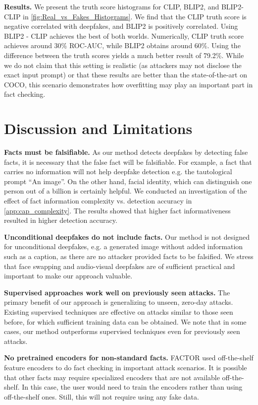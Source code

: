 \documentclass{article} \usepackage{iclr2024_conference,times}
\begin{document}
\textbf{Results.} We present the truth score histograms for CLIP, BLIP2, and BLIP2-CLIP in \cref{fig:Real_vs_Fakes_Histograms}. We find that the CLIP truth score is negative correlated with deepfakes, and BLIP2 is positively correlated. Using BLIP2 - CLIP achieves the best of both worlds. Numerically, CLIP truth score achieves around 30\% ROC-AUC, while BLIP2 obtains around 60\%. Using the difference between the truth scores yields a much better result of 79.2\%. While we do not claim that this setting is realistic (as attackers may not disclose the exact input prompt) or that these results are better than the state-of-the-art on COCO, this scenario demonstrates how overfitting may play an important part in fact checking.

\section{Discussion and Limitations}

\textbf{Facts must be falsifiable.} As our method detects deepfakes by detecting false facts, it is necessary that the false fact will be falsifiable. For example, a fact that carries no information will not help deepfake detection e.g. the tautological prompt “An image”. On the other hand, facial identity, which can distinguish one person out of a billion is certainly helpful. We conducted an investigation of the effect of fact information complexity vs. detection accuracy in \cref{app:cap_complexity}. The results showed that higher fact informativeness resulted in higher detection accuracy.  

\textbf{Unconditional deepfakes do not include facts.} Our method is not designed for unconditional deepfakes, e.g. a generated image without added information such as a caption, as there are no attacker provided facts to be falsified. We stress that face swapping and audio-visual deepfakes are of sufficient practical and important to make our approach valuable. 

\textbf{Supervised approaches work well on previously seen attacks.} The primary benefit of our approach is generalizing to unseen, zero-day attacks. Existing supervised techniques are effective on attacks similar to those seen before, for which sufficient training data can be obtained. We note that in some cases, our method outperforms supervised techniques even for previously seen attacks.

\textbf{No pretrained encoders for non-standard facts.} FACTOR used off-the-shelf feature encoders to do fact checking in important attack scenarios. It is possible that other facts may require specialized encoders that are not available off-the-shelf. In this case, the user would need to train the encoders rather than using off-the-shelf ones. Still, this will not require using any fake data. 
\end{document}
